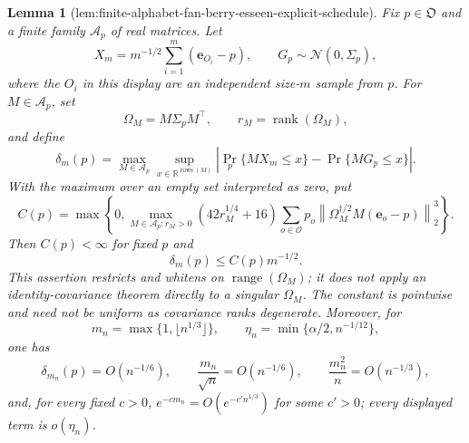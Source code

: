 \documentclass{article}
\newtheorem{lemma}{Lemma}
\begin{document}
\begin{lemma}[lem:finite-alphabet-fan-berry-esseen-explicit-schedule]\label{lem:finite-alphabet-fan-berry-esseen-explicit-schedule}
Fix \(p\in\mathfrak O\) and a finite family \(\mathcal A_p\) of real matrices.  Let
\[
X_m=m^{-1/2}\sum_{i=1}^m(\mathbf e_{O_i}-p),
\qquad G_p\sim\mathcal N(0,\Sigma_p),
\]
where the \(O_i\) in this display are an independent size-\(m\) sample from \(p\).  For \(M\in\mathcal A_p\), set
\[
\Omega_M=M\Sigma_pM^{\top},\qquad r_M=\operatorname{rank}(\Omega_M),
\]
and define
\[
\delta_m(p)=\max_{M\in\mathcal A_p}\sup_{x\in\mathbb R^{\operatorname{rows}(M)}}
\left|\Pr_p\{MX_m\leq x\}-\Pr\{MG_p\leq x\}\right|.
\]
With the maximum over an empty set interpreted as zero, put
\[
C(p)=\max\left\{0,\max_{M\in\mathcal A_p:r_M>0}
\left(42r_M^{1/4}+16\right)
\sum_{o\in\mathcal O}p_o
\left\|\Omega_M^{\dagger/2}M(\mathbf e_o-p)\right\|_2^3\right\}.
\]
Then \(C(p)<\infty\) for fixed \(p\) and
\[
\delta_m(p)\leq C(p)m^{-1/2}.
\]
This assertion restricts and whitens on \(\operatorname{range}(\Omega_M)\); it does not apply an identity-covariance theorem directly to a singular \(\Omega_M\).  The constant is pointwise and need not be uniform as covariance ranks degenerate.  Moreover, for
\[
m_n=\max\{1,\lfloor n^{1/3}\rfloor\},
\qquad
\eta_n=\min\{\alpha/2,n^{-1/12}\},
\]
one has
\[
\delta_{m_n}(p)=O(n^{-1/6}),\qquad
\frac{m_n}{\sqrt n}=O(n^{-1/6}),\qquad
\frac{m_n^2}{n}=O(n^{-1/3}),
\]
and, for every fixed \(c>0\), \(e^{-cm_n}=O(e^{-c'n^{1/3}})\) for some \(c'>0\); every displayed term is \(o(\eta_n)\).
\end{lemma}
\end{document}
